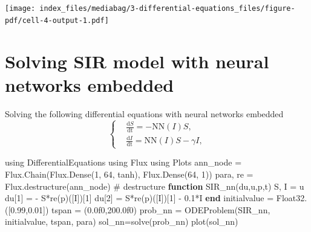 \documentclass[
  letterpaper,
  DIV=11,
  numbers=noendperiod]{scrreport}
\newenvironment{Shaded}{\begin{snugshade}}{\end{snugshade}}
\newcommand{\BuiltInTok}[1]{\textcolor[rgb]{0.00,0.23,0.31}{#1}}
\newcommand{\CommentTok}[1]{\textcolor[rgb]{0.37,0.37,0.37}{#1}}
\newcommand{\FloatTok}[1]{\textcolor[rgb]{0.68,0.00,0.00}{#1}}
\newcommand{\FunctionTok}[1]{\textcolor[rgb]{0.28,0.35,0.67}{#1}}
\newcommand{\ImportTok}[1]{\textcolor[rgb]{0.00,0.46,0.62}{#1}}
\newcommand{\KeywordTok}[1]{\textcolor[rgb]{0.00,0.23,0.31}{\textbf{#1}}}
\newcommand{\NormalTok}[1]{\textcolor[rgb]{0.00,0.23,0.31}{#1}}
\newcommand{\OperatorTok}[1]{\textcolor[rgb]{0.37,0.37,0.37}{#1}}
\begin{document}
\texttt{[image: index\_files/mediabag/3-differential-equations\_files/figure-pdf/cell-4-output-1.pdf]}

\section{Solving SIR model with neural networks
embedded}\label{solving-sir-model-with-neural-networks-embedded}

Solving the following differential equations with neural networks
embedded \[
    \left\{
    \begin{aligned}
         & \frac{\mathrm{d}S}{\mathrm{dt}} = - \mathrm{NN}(I) S ,        \\
         & \frac{\mathrm{d}I}{\mathrm{dt}} = \mathrm{NN}(I) S- \gamma I,
    \end{aligned}
    \right.
\]

\begin{Shaded}
\begin{Highlighting}[]
\ImportTok{using} \BuiltInTok{DifferentialEquations}
\ImportTok{using} \BuiltInTok{Flux}
\ImportTok{using} \BuiltInTok{Plots}
\NormalTok{ann\_node }\OperatorTok{=}\NormalTok{ Flux.}\FunctionTok{Chain}\NormalTok{(Flux.}\FunctionTok{Dense}\NormalTok{(}\FloatTok{1}\NormalTok{, }\FloatTok{64}\NormalTok{, tanh), Flux.}\FunctionTok{Dense}\NormalTok{(}\FloatTok{64}\NormalTok{, }\FloatTok{1}\NormalTok{))}
\NormalTok{para, re }\OperatorTok{=}\NormalTok{ Flux.}\FunctionTok{destructure}\NormalTok{(ann\_node) }\CommentTok{\# destructure}
\KeywordTok{function} \FunctionTok{SIR\_nn}\NormalTok{(du,u,p,t)}
\NormalTok{    S, I }\OperatorTok{=}\NormalTok{ u}
\NormalTok{    du[}\FloatTok{1}\NormalTok{] }\OperatorTok{=}  \OperatorTok{{-}} \FunctionTok{S*re}\NormalTok{(p)([I])[}\FloatTok{1}\NormalTok{]}
\NormalTok{    du[}\FloatTok{2}\NormalTok{] }\OperatorTok{=} \FunctionTok{S*re}\NormalTok{(p)([I])[}\FloatTok{1}\NormalTok{] }\OperatorTok{{-}} \FloatTok{0.1}\OperatorTok{*}\NormalTok{I}
\KeywordTok{end}
\NormalTok{initialvalue }\OperatorTok{=} \FunctionTok{Float32}\NormalTok{.([}\FloatTok{0.99}\NormalTok{,}\FloatTok{0.01}\NormalTok{])}
\NormalTok{tspan }\OperatorTok{=}\NormalTok{ (}\FloatTok{0.0f0}\NormalTok{,}\FloatTok{200.0f0}\NormalTok{)}
\NormalTok{prob\_nn }\OperatorTok{=} \FunctionTok{ODEProblem}\NormalTok{(SIR\_nn, initialvalue, tspan, para)}
\NormalTok{sol\_nn}\OperatorTok{=}\FunctionTok{solve}\NormalTok{(prob\_nn)}
\FunctionTok{plot}\NormalTok{(sol\_nn)}
\end{Highlighting}
\end{Shaded}
\end{document}
